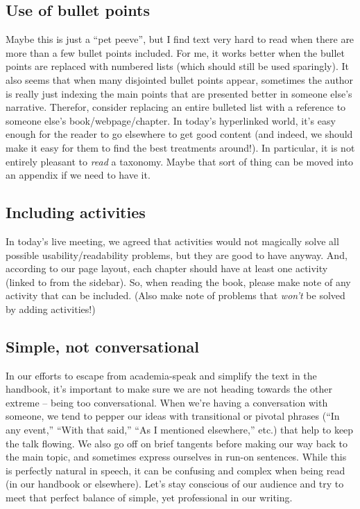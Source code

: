 \subsection{Use of bullet points}

Maybe this is just a ``pet peeve'', but I find text very hard to read
when there are more than a few bullet points included. For me, it works
better when the bullet points are replaced with numbered lists (which
should still be used sparingly). It also seems that when many disjointed
bullet points appear, sometimes the author is really just indexing the
main points that are presented better in someone else's narrative.
Therefor, consider replacing an entire bulleted list with a reference to
someone else's book/webpage/chapter. In today's hyperlinked world, it's
easy enough for the reader to go elsewhere to get good content (and
indeed, we should make it easy for them to find the best treatments
around!). In particular, it is not entirely pleasant to \emph{read} a
taxonomy. Maybe that sort of thing can be moved into an appendix if we
need to have it.

\subsection{Including activities}

In today's live meeting, we agreed that activities would not magically
solve all possible usability/readability problems, but they are good to
have anyway. And, according to our page layout, each chapter should have
at least one activity (linked to from the sidebar). So, when reading the
book, please make note of any activity that can be included. (Also make
note of problems that \emph{won't} be solved by adding activities!)

\subsection{Simple, not conversational}

In our efforts to escape from academia-speak and simplify the text in
the handbook, it's important to make sure we are not heading towards the
other extreme -- being too conversational. When we're having a
conversation with someone, we tend to pepper our ideas with transitional
or pivotal phrases (``In any event,'' ``With that said,'' ``As I
mentioned elsewhere,'' etc.) that help to keep the talk flowing. We also
go off on brief tangents before making our way back to the main topic,
and sometimes express ourselves in run-on sentences. While this is
perfectly natural in speech, it can be confusing and complex when being
read (in our handbook or elsewhere). Let's stay conscious of our
audience and try to meet that perfect balance of simple, yet
professional in our writing.

